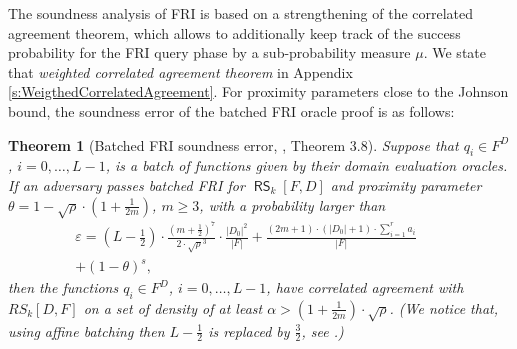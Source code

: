 \documentclass[11pt,article,oneside]{memoir}
\newtheorem{thm}{Theorem}[]
\newtheorem{prop}[]{Proposition}
\theoremstyle{definition}
\theoremstyle{remark}
\DeclareMathOperator{\RS}{\mathsf{RS}}
\begin{document}
%

The soundness analysis of FRI is based on a strengthening of the correlated agreement theorem, which allows to additionally keep track of the success probability for the FRI query phase by a sub-probability measure $\mu$.
We state that \textit{weighted correlated agreement theorem} in Appendix \ref{s:WeigthedCorrelatedAgreement}.
For proximity parameters close to the Johnson bound, the soundness error of the batched FRI oracle proof is as follows:

\begin{thm}[Batched FRI soundness error, \cite{ProximityGaps}, Theorem 3.8]
\label{thm:BatchedFRISoundness}
Suppose that $q_i\in F^D$, $i=0,\ldots,L-1$, is a batch of functions given by their domain evaluation oracles.
 If an adversary passes batched FRI for $\RS_k[F,D]$ and proximity parameter $\theta =1-\sqrt\rho \cdot \left(1+\frac{1}{2m}\right)$, $m\geq 3$, with a probability larger than
\begin{equation}
\label{e:EpsilonFRI}
\begin{aligned} 
\varepsilon = \left(L-\frac{1}{2}\right) \cdot \frac {\left(m+ \frac{1}{2}\right)^7}{2\cdot\sqrt\rho^3}\cdot \frac{|D_0|^2}{|F|} 
+ \frac{(2m+1)\cdot (|D_0|+1)\cdot \sum_{i=1}^{r} a_i}{|F|} \quad\quad
\\
+(1-\theta)^s ,
\end{aligned}
\end{equation}
 then the functions $q_i\in F^D$, $i=0,\ldots,L-1$, have correlated agreement with $RS_k[D,F]$ on a set of density of at least $\alpha >\left(1+\frac{1}{2m}\right)\cdot \sqrt\rho$.
(We notice that, using affine batching then $L-\frac{1}{2}$ is replaced by $\frac{3}{2}$, see \cite{ProximityGaps}.)
\end{thm}
\end{document}
